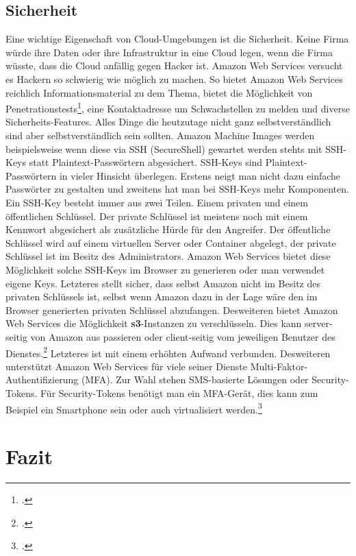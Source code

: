 \documentclass[titlepage]{report}
\begin{document}
\section*{Sicherheit}
Eine wichtige Eigenschaft von Cloud\hyp{}Umgebungen ist die Sicherheit.
Keine Firma würde ihre Daten oder ihre Infrastruktur in eine Cloud
legen, wenn die Firma wüsste, dass die Cloud anfällig gegen Hacker ist.
Amazon Web Services versucht es Hackern so schwierig wie möglich zu
machen. So bietet Amazon Web Services reichlich Informationsmaterial zu
dem Thema, bietet die Möglichkeit von
Penetrationstests\footcite{penetration}, eine
Kontaktadresse um Schwachstellen zu melden und diverse
Sicherheits\hyp{}Features. Alles Dinge die heutzutage nicht ganz
selbstverständlich sind aber selbstverständlich sein sollten.
Amazon Machine Images werden beispielsweise wenn diese via SSH
(SecureShell) gewartet werden stehts mit SSH\hyp{}Keys statt
Plaintext\hyp{}Passwörtern abgesichert. SSH\hyp{}Keys sind
Plaintext\hyp{}Passwörtern in vieler Hinsicht überlegen. Erstens neigt
man nicht dazu einfache Passwörter zu gestalten und zweitens hat man bei
SSH\hyp{}Keys mehr Komponenten. Ein SSH\hyp{}Key besteht immer aus zwei
Teilen. Einem privaten und einem öffentlichen Schlüssel. Der private
Schlüssel ist meistens noch mit einem Kennwort abgesichert als
zusätzliche Hürde für den Angreifer. Der öffentliche Schlüssel wird auf
einem virtuellen Server oder Container abgelegt, der private Schlüssel
ist im Besitz des Administrators. Amazon Web Services bietet diese
Möglichkeit solche SSH\hyp{}Keys im Browser zu generieren oder man
verwendet eigene Keys. Letzteres stellt sicher, dass selbst Amazon nicht
im Besitz des privaten Schlüssels ist, selbst wenn Amazon dazu in der
Lage wäre den im Browser generierten privaten Schlüssel abzufangen.
Desweiteren bietet Amazon Web Services die Möglichkeit
\textbf{s3}\hyp{}Instanzen zu verschlüsseln. Dies kann
server\hyp{}seitig von Amazon aus passieren oder client\hyp{}seitig vom
jeweiligen Benutzer des Dienstes.\footcite{encryption} Letzteres ist mit
einem erhöhten Aufwand verbunden. Desweiteren unterstützt Amazon Web
Services für viele seiner Dienste
Multi\hyp{}Faktor\hyp{}Authentifizierung (MFA). Zur Wahl stehen
SMS\hyp{}basierte Lösungen oder Security\hyp{}Tokens. Für
Security\hyp{}Tokens benötigt man ein MFA\hyp{}Gerät, dies kann zum
Beispiel ein Smartphone sein oder auch virtualisiert
werden.\footcite{mfa}
\chapter*{Fazit}
\nocite{*}
\printbibliography
\listoffigures
\end{document}

